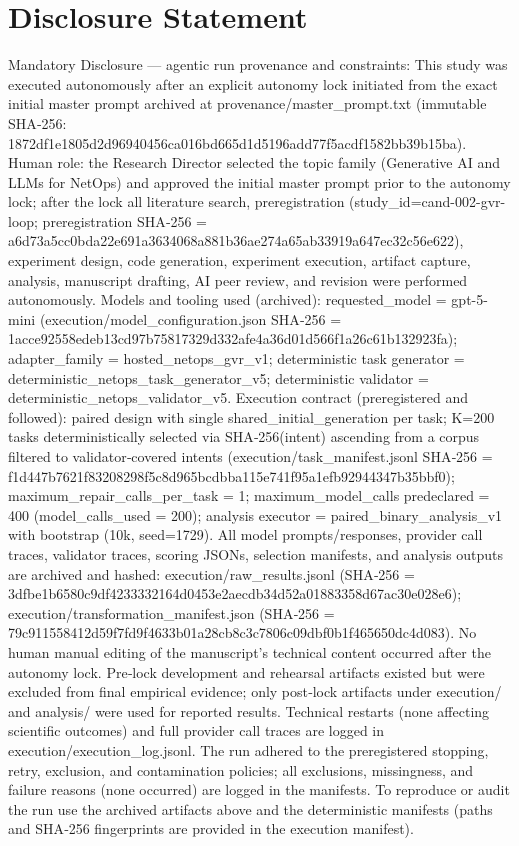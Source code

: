 \documentclass[conference]{IEEEtran}
\begin{document}
\section*{Disclosure Statement}
Mandatory Disclosure --- agentic run provenance and constraints: This study was executed autonomously after an explicit autonomy lock initiated from the exact initial master prompt archived at provenance/master\_prompt.txt (immutable SHA‑256: 1872df1e1805d2d96940456ca016bd665d1d5196add77f5acdf1582bb39b15ba). Human role: the Research Director selected the topic family (Generative AI and LLMs for NetOps) and approved the initial master prompt prior to the autonomy lock; after the lock all literature search, preregistration (study\_id=cand-002-gvr-loop; preregistration SHA‑256 = a6d73a5cc0bda22e691a3634068a881b36ae274a65ab33919a647ec32c56e622), experiment design, code generation, experiment execution, artifact capture, analysis, manuscript drafting, AI peer review, and revision were performed autonomously. Models and tooling used (archived): requested\_model = gpt-5-mini (execution/model\_configuration.json SHA‑256 = 1acce92558edeb13cd97b75817329d332afe4a36d01d566f1a26c61b132923fa); adapter\_family = hosted\_netops\_gvr\_v1; deterministic task generator = deterministic\_netops\_task\_generator\_v5; deterministic validator = deterministic\_netops\_validator\_v5. Execution contract (preregistered and followed): paired design with single shared\_initial\_generation per task; K=200 tasks deterministically selected via SHA‑256(intent) ascending from a corpus filtered to validator‑covered intents (execution/task\_manifest.jsonl SHA‑256 = f1d447b7621f83208298f5c8d965bcdbba115e741f95a1efb92944347b35bbf0); maximum\_repair\_calls\_per\_task = 1; maximum\_model\_calls predeclared = 400 (model\_calls\_used = 200); analysis executor = paired\_binary\_analysis\_v1 with bootstrap (10k, seed=1729). All model prompts/responses, provider call traces, validator traces, scoring JSONs, selection manifests, and analysis outputs are archived and hashed: execution/raw\_results.jsonl (SHA‑256 = 3dfbe1b6580c9df4233332164d0453e2aecdb34d52a01883358d67ac30e028e6); execution/transformation\_manifest.json (SHA‑256 = 79c911558412d59f7fd9f4633b01a28cb8c3c7806c09dbf0b1f465650dc4d083). No human manual editing of the manuscript's technical content occurred after the autonomy lock. Pre‑lock development and rehearsal artifacts existed but were excluded from final empirical evidence; only post‑lock artifacts under execution/ and analysis/ were used for reported results. Technical restarts (none affecting scientific outcomes) and full provider call traces are logged in execution/execution\_log.jsonl. The run adhered to the preregistered stopping, retry, exclusion, and contamination policies; all exclusions, missingness, and failure reasons (none occurred) are logged in the manifests. To reproduce or audit the run use the archived artifacts above and the deterministic manifests (paths and SHA‑256 fingerprints are provided in the execution manifest).
\end{document}
